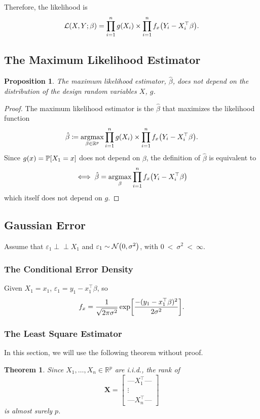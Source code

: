 \documentclass[letterpaper, reqno]{amsart}
\newtheorem{theorem}{Theorem}[section]
\newtheorem{prop}{Proposition}[section]
\numberwithin{equation}{section}
\newcommand{\T}{\top} %
\newcommand{\vect}[1]{\boldsymbol{\mathbf{#1}}} %
\newcommand{\Prob}[1]{\mathbb{P}\mleft[#1\mright]}
\newcommand{\Li}[1]{\mathcal{L}\mleft( #1 \mright)}  %
\newcommand{\R}{\mathbb{R}}  %
\newcommand{\N}[2]{\mathcal{N}\mleft( #1, #2 \mright)}
\newcommand{\indep}{\perp \!\!\! \perp}  %
\newcommand{\iid}{i.i.d.}
\newcommand{\Xm}{\vect{X}}
\newcommand{\Bv}{\beta}
\newcommand{\Bvh}{\hat{\beta}}
\newcommand{\ve}{\varepsilon}
\DeclareMathOperator*{\argmax}{argmax}
\begin{document}
Therefore, the likelihood is
  \[ \Li{X, Y; \Bv} = \prod_{i=1}^n g(X_i) \times \prod_{i=1}^n f_x\mleft(Y_i - X_i^\T\Bv\mright). \]

\subsection{The Maximum Likelihood Estimator}
\begin{prop}
  The maximum likelihood estimator, $\Bvh$, does not depend on the distribution
  of the design random variables $X$, $g$.
\end{prop}

\begin{proof}
  The maximum likelihood estimator is the $\Bvh$ that maximizes the likelihood
  function
  \[ \Bvh \coloneqq \argmax_{\Bv \in \R^p} \prod_{i=1}^n g(X_i) 
    \times \prod_{i=1}^n f_x\mleft(Y_i - X_i^\T\Bv\mright). \]
  Since $g(x) = \Prob{X_1 = x}$ does not depend on $\Bv$, the definition of
  $\Bvh$ is equivalent to
  \[ \iff \Bvh = \argmax_\Bv \prod_{i=1}^n f_x\mleft(Y_i - X_i^\T\Bv\mright) \]
  which itself does not depend on $g$.
\end{proof}

\subsection{Gaussian Error}
Assume that $\ve_1 \indep X_1$ and $\ve_1 \sim \N{0}{\sigma^2}$,
with $0~<~\sigma^2~<~\infty$.

\subsubsection{The Conditional Error Density}
Given $X_1 = x_1$, $\ve_1 = y_1 - x_1^\T\Bv$, so
\[ f_x = \frac{1}{\sqrt{2\pi\sigma^2}} \exp \mleft[\frac{-(y_1 - x_1^\T\Bv)^2}{2\sigma^2}\mright]. \]

\subsubsection{The Least Square Estimator}
In this section, we will use the following theorem without proof.
\begin{theorem}
Since $X_1, \dots, X_n \in \R^p$ are \iid, the rank of
\[ \Xm = \begin{bmatrix} 
            \text{---} X_1^\T \text{---} \\
            \vdots \\ 
            \text{---} X_n^\T \text{---} 
          \end{bmatrix} 
\]
is almost surely $p$.
\end{theorem}
\end{document}
